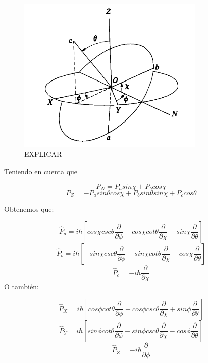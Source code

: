 \documentclass[a4paper]{article}
\begin{document}
\begin{figure}
\includegraphics[width=0.8\textwidth]{Angulos_Euler.png}
\caption{EXPLICAR}
\label{euler}
\end{figure}

Teniendo en cuenta que 

$$ P_N=  P_a sin\chi + P_b cos\chi$$  
$$ P_Z= -P_a sin\theta cos\chi + P_b sin\theta sin\chi + P_c cos\theta $$

Obtenemos que:

\begin{equation}
\hat P_a = i\hbar \left[cos\chi csc\theta \frac{\partial}{\partial \phi} - cos\chi cot\theta \frac{\partial}{\partial \chi} - sin\chi \frac{\partial}{\partial \theta} \right]
\end{equation}
\begin{equation}
\hat P_b = i\hbar \left[-sin\chi csc\theta \frac{\partial}{\partial \phi} + sin\chi cot\theta \frac{\partial}{\partial \chi} - cos\chi \frac{\partial}{\partial \theta} \right]
\end{equation}
\begin{equation}
\hat P_c = -i\hbar \frac{\partial}{\partial\chi}
\end{equation}
O también:

\begin{equation}
\hat P_X = i\hbar \left[cos\phi cot\theta \frac{\partial}{\partial \phi} - cos\phi csc\theta \frac{\partial}{\partial \chi} + sin\phi \frac{\partial}{\partial \theta} \right]
\end{equation}
\begin{equation}
\hat P_Y = i\hbar \left[sin\phi cot\theta \frac{\partial}{\partial \phi} - sin\phi csc\theta \frac{\partial}{\partial \chi} - cos\phi \frac{\partial}{\partial \theta} \right]
\end{equation}
\begin{equation}
\hat P_Z = -i\hbar\frac{\partial}{\partial\phi} 
\end{equation}
\end{document}

